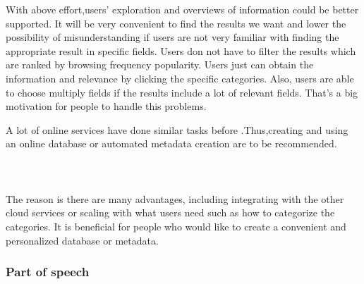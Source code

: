 With above effort,users' exploration and overviews of information could be better supported. It will be very convenient to find the results we want and lower the possibility of misunderstanding if users are not very familiar with finding the appropriate result in specific fields.\cite{TunThuraThet2010} Users don not have to filter the results which are ranked by browsing frequency popularity. Users just can obtain the information and relevance by clicking the specific categories. Also, users are able to choose multiply fields if the results include a lot of relevant fields. That's a big motivation for people to handle this problems. 

A lot of online services have done similar tasks before .Thus,creating and using an online database or automated metadata creation are to be recommended. \\\\\\\\ The reason is there are many advantages, including integrating with the other cloud services or scaling with what users need such as how to categorize the categories. It is beneficial for people who would like to create a convenient and personalized database or metadata.\\

\subsubsection*{Part of speech}

